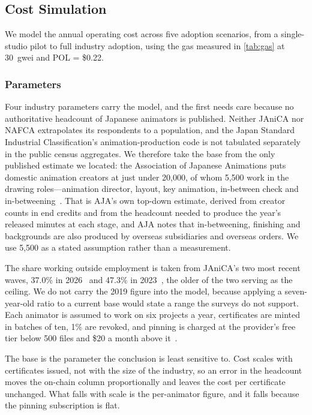 
\subsection{Cost Simulation}
\label{subsec:cost_sim}

We model the annual operating cost across five adoption scenarios, from a single-studio
pilot to full industry adoption, using the gas measured in \cref{tab:gas} at 30~gwei and
POL = \$0.22.

\subsubsection{Parameters}

Four industry parameters carry the model, and the first needs care because no
authoritative headcount of Japanese animators is published. Neither JAniCA nor NAFCA
extrapolates its respondents to a population, and the Japan Standard Industrial
Classification's animation-production code is not tabulated separately in the public
census aggregates. We therefore take the base from the only published estimate we
located: the Association of Japanese Animations puts domestic animation creators at just
under 20{,}000, of whom 5{,}500 work in the drawing roles---animation director, layout,
key animation, in-between check and in-betweening~\cite{aja2025creators}. That is AJA's
own top-down estimate, derived from creator counts in end credits and from the headcount
needed to produce the year's
released minutes at each stage, and AJA notes that in-betweening, finishing and
backgrounds are also produced by overseas subsidiaries and overseas orders. We use
5{,}500 as a stated assumption rather than a measurement.

The share working outside employment is taken from JAniCA's two most recent waves,
37.0\% in 2026~\cite{janica2026survey} and 47.3\% in 2023~\cite{janica2023survey}, the
older of the two serving as the ceiling. We do not carry the 2019 figure into the model,
because applying a seven-year-old ratio to a current base would state a range the
surveys do not support. Each animator is
assumed to work on six projects a year, certificates are minted in batches of ten, 1\%
are revoked, and pinning is charged at the provider's free tier below 500 files and
\$20 a month above it~\cite{pinata2026pricing}.

The base is the parameter the conclusion is least sensitive to. Cost scales with
certificates issued, not with the size of the industry, so an error in the headcount
moves the on-chain column proportionally and leaves the cost per certificate unchanged.
What falls with scale is the per-animator figure, and it falls because the pinning
subscription is flat.

